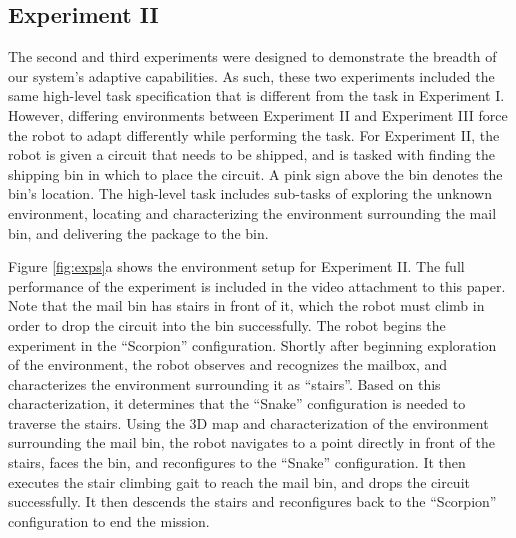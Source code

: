 \documentclass[conference]{IEEEtran}
\begin{document}
\subsection{Experiment II}

The second and third experiments were designed to demonstrate the breadth of our system's adaptive capabilities. As such, these two experiments included the same high-level task specification that is different from the task in Experiment I. However, differing environments between Experiment II and Experiment III force the robot to adapt differently while performing the task. For Experiment II, the robot is given a circuit that needs to be shipped, and is tasked with finding the shipping bin in which to place the circuit. A pink sign above the bin denotes the bin's location. The high-level task includes sub-tasks of exploring the unknown environment, locating and characterizing the environment surrounding the mail bin, and delivering the package to the bin.

Figure \ref{fig:exps}a shows the environment setup for Experiment II. The full performance of the experiment is included in the video attachment to this paper. Note that the mail bin has stairs in front of it, which the robot must climb in order to drop the circuit into the bin successfully. The robot begins the experiment in the ``Scorpion'' configuration. Shortly after beginning exploration of the environment, the robot observes and recognizes the mailbox, and characterizes the environment surrounding it as ``stairs''. Based on this characterization, it determines that the ``Snake'' configuration is needed to traverse the stairs. Using the 3D map and characterization of the environment surrounding the mail bin, the robot navigates to a point directly in front of the stairs, faces the bin, and reconfigures to the ``Snake'' configuration. It then executes the stair climbing gait to reach the mail bin, and drops the circuit successfully. It then descends the stairs and reconfigures back to the ``Scorpion'' configuration to end the mission.
\end{document}
